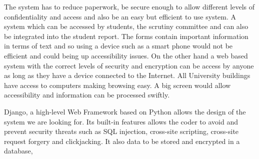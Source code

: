 \documentclass[../main.tex]{subfiles}
\begin{document}
\raggedright
The system has to reduce paperwork, be secure enough to allow different levels of confidentiality and access and also be an easy but efficient to use system. A system which can be accessed by students, the scrutiny committee and can also be integrated into the student report. The forms contain important information in terms of text and so using a device such as a smart phone would not be efficient and could being up accessibility issues. On the other hand a web based system with the correct levels of security and encryption can be access by anyone as long as they have a device connected to the Internet. All University buildings have access to computers making browsing easy. A big screen would allow accessibility and information can be processed swiftly.

Django\cite{django}, a high-level Web Framework based on Python allows the design of the system we are looking for. Its built-in features allows the coder to avoid and prevent security threats such as SQL injection, cross-site scripting, cross-site request forgery and clickjacking\cite{django}. It also data to be stored and encrypted in a database, 
\end{document}
